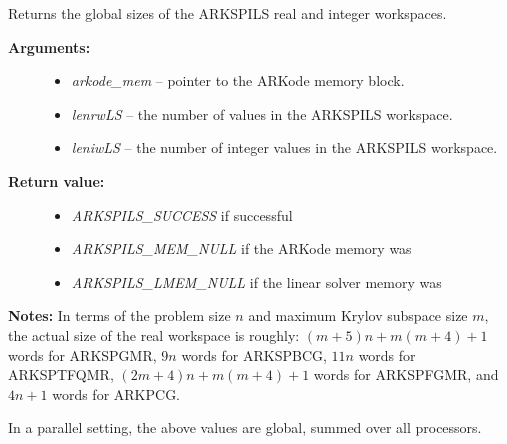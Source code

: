 \documentclass[letterpaper,10pt,english]{sphinxmanual}
\begin{document}
\begin{fulllineitems}
\label{c_interface/User_callable:ARKSpilsGetWorkSpace}
Returns the global sizes of the ARKSPILS real and integer workspaces.
\begin{description}
\item[{\textbf{Arguments:}}] \leavevmode\begin{itemize}
\item {} 
\emph{arkode\_mem} -- pointer to the ARKode memory block.

\item {} 
\emph{lenrwLS} -- the number of  values in the ARKSPILS workspace.

\item {} 
\emph{leniwLS} -- the number of integer values in the ARKSPILS workspace.

\end{itemize}

\item[{\textbf{Return value:}}] \leavevmode\begin{itemize}
\item {} 
\emph{ARKSPILS\_SUCCESS} if successful

\item {} 
\emph{ARKSPILS\_MEM\_NULL} if the ARKode memory was 

\item {} 
\emph{ARKSPILS\_LMEM\_NULL} if the linear solver memory was 

\end{itemize}

\end{description}

\textbf{Notes:} In terms of the problem size $n$ and maximum Krylov subspace
size $m$, the actual size of the real workspace is roughly:
$(m+5)n+m(m+4)+1$  words for ARKSPGMR,
$9n$  words for ARKSPBCG, $11n$
 words for ARKSPTFQMR, $(2m+4)n+m(m+4)+1$
 words for ARKSPFGMR, and $4n+1$
 words for ARKPCG.

In a parallel setting, the above values are global, summed over all
processors.

\end{fulllineitems}

\end{document}
